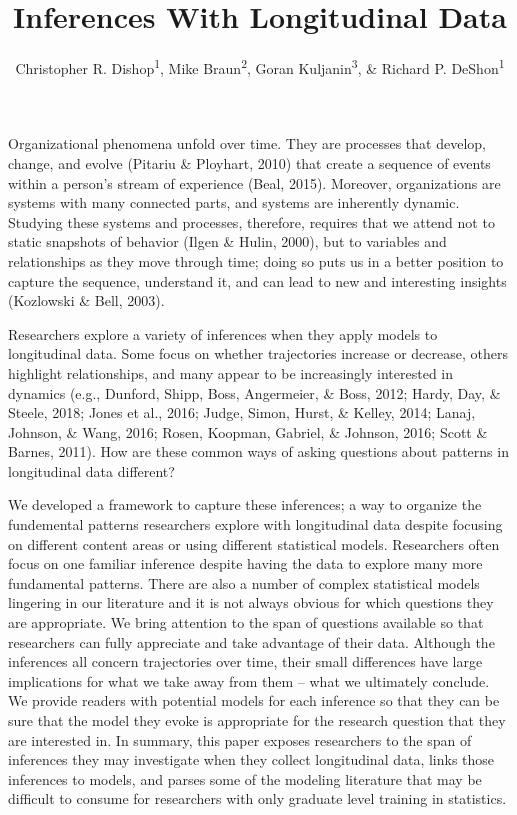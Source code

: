 \documentclass[english,,man]{apa6}
\title{Inferences With Longitudinal Data}
\author{Christopher R. Dishop\textsuperscript{1}, Mike Braun\textsuperscript{2},
Goran Kuljanin\textsuperscript{3}, \& Richard P.
DeShon\textsuperscript{1}}
\date{}
\affiliation{
\vspace{0.5cm}
\textsuperscript{1} Michigan State University\\\textsuperscript{2} University of South Florida\\\textsuperscript{3} DePaul University}
\theoremstyle{definition}
\theoremstyle{definition}
\theoremstyle{definition}
\theoremstyle{remark}
\begin{document}
\maketitle

Organizational phenomena unfold over time. They are processes that
develop, change, and evolve (Pitariu \& Ployhart, 2010) that create a
sequence of events within a person's stream of experience (Beal, 2015).
Moreover, organizations are systems with many connected parts, and
systems are inherently dynamic. Studying these systems and processes,
therefore, requires that we attend not to static snapshots of behavior
(Ilgen \& Hulin, 2000), but to variables and relationships as they move
through time; doing so puts us in a better position to capture the
sequence, understand it, and can lead to new and interesting insights
(Kozlowski \& Bell, 2003).

Researchers explore a variety of inferences when they apply models to
longitudinal data. Some focus on whether trajectories increase or
decrease, others highlight relationships, and many appear to be
increasingly interested in dynamics (e.g., Dunford, Shipp, Boss,
Angermeier, \& Boss, 2012; Hardy, Day, \& Steele, 2018; Jones et al.,
2016; Judge, Simon, Hurst, \& Kelley, 2014; Lanaj, Johnson, \& Wang,
2016; Rosen, Koopman, Gabriel, \& Johnson, 2016; Scott \& Barnes, 2011).
How are these common ways of asking questions about patterns in
longitudinal data different?

We developed a framework to capture these inferences; a way to organize
the fundemental patterns researchers explore with longitudinal data
despite focusing on different content areas or using different
statistical models. Researchers often focus on one familiar inference
despite having the data to explore many more fundamental patterns. There
are also a number of complex statistical models lingering in our
literature and it is not always obvious for which questions they are
appropriate. We bring attention to the span of questions available so
that researchers can fully appreciate and take advantage of their data.
Although the inferences all concern trajectories over time, their small
differences have large implications for what we take away from them --
what we ultimately conclude. We provide readers with potential models
for each inference so that they can be sure that the model they evoke is
appropriate for the research question that they are interested in. In
summary, this paper exposes researchers to the span of inferences they
may investigate when they collect longitudinal data, links those
inferences to models, and parses some of the modeling literature that
may be difficult to consume for researchers with only graduate level
training in statistics.
\end{document}
